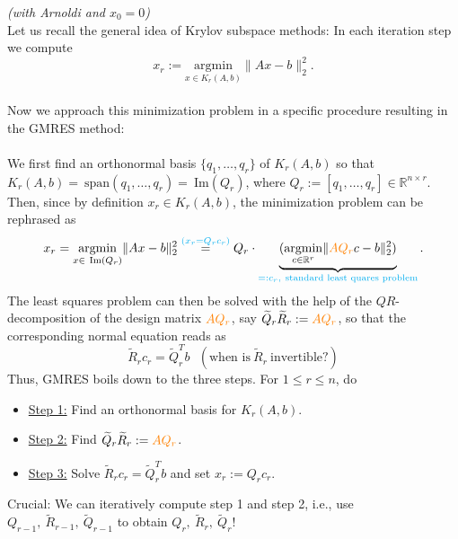 \begin{frame}
	\textit{\footnotesize(with Arnoldi and $x_0=0$)}\\
Let us recall the general idea of Krylov subspace methods: In each iteration step we compute
		$$
		x_r:=\underset{x\in K_r(A,b)}{\mathrm{argmin}}\|Ax-b\|^2_2.
		$$
~\\
Now we approach this minimization problem in a specific procedure resulting in the GMRES method:\\~\\
We first find an orthonormal basis $\{q_1,\dots,q_r\}$ of $K_r(A,b)$ so that $K_r(A,b)=~\text{span}(q_1,\dots,q_r)=~\text{Im}(Q_r)$, where $Q_r:=[q_1,\dots,q_r]\in\mathbb{R}^{n\times r}$. Then, since by definition $x_r \in K_r(A,b)$, the minimization problem can be rephrased as
$$
x_r=\underset{x\in~\text{Im}(Q_r)}{\mathrm{argmin}}\|Ax-b\|_2^2\stackrel{{\color{cyan}(x_r=Q_rc_r)}}{=}Q_r\cdot\underbrace{(\underset{c\in\mathbb{R}^r}{\mathrm{argmin}}\|{\color{orange}AQ_r}c-b\|_2^2)}_{{\color{cyan}=:c_r,~\text{standard least quares problem}}}.
$$
The least squares problem can then be solved with the help of the $QR$-decomposition of the design matrix ${\color{orange}AQ_r}$, say $\widetilde{Q}_r\widetilde{R}_r :={\color{orange}AQ_r}$, so that the corresponding normal equation reads as
$$
\widetilde{R}_rc_r=\widetilde{Q}_r^Tb~~~(\text{when is}~\widetilde{R}_r~\text{invertible?})
$$
Thus, GMRES boils down to the three steps. For $1 \leq r \leq n$, do
\begin{itemize} \color{header}
	\item \underline{Step 1:}
	Find an orthonormal basis for $K_r(A,b)$.
	\item \underline{Step 2:}
	Find $\widetilde{Q}_r\widetilde{R}_r:={\color{orange}AQ_r}$.
	\item \underline{Step 3:}
	Solve $
	\widetilde{R}_rc_r=\widetilde{Q}_r^Tb$ and set $x_r:=Q_rc_r$.
\end{itemize}
{Crucial:} We can iteratively compute step 1 and step 2, i.e.,  use $Q_{r-1},~\widetilde{R}_{r-1},~ \widetilde{Q}_{r-1}$ to obtain $Q_{r}, ~\widetilde{R}_r,~ \widetilde{Q}_{r}$!\\
\end{frame}

